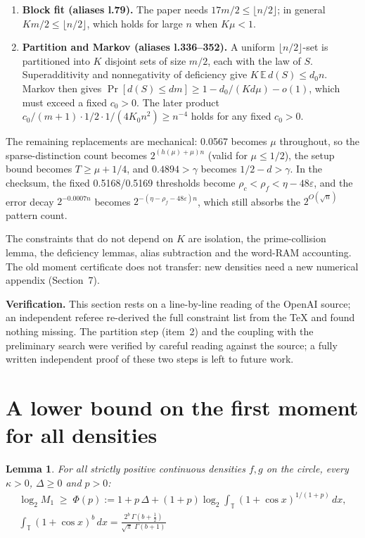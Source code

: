 \documentclass[11pt]{article}
\newcommand{\E}{\mathbb{E}}
\newcommand{\eps}{\varepsilon}
\theoremstyle{plain}
\newtheorem{lemma}{Lemma}
\begin{document}
\begin{enumerate}
\item \textbf{Block fit (aliases l.79).} The paper needs $17 m/2 \le \lfloor n/2 \rfloor$; in general $K m/2 \le \lfloor n/2 \rfloor$, which holds for large $n$ when $K\mu < 1$.
\item \textbf{Partition and Markov (aliases l.336--352).} A uniform $\lfloor n/2 \rfloor$-set is partitioned into $K$ disjoint sets of size $m/2$, each with the law of $S$. Superadditivity and nonnegativity of deficiency give $K\, \E\, d(S) \le d_0 n$. Markov then gives $\Pr[d(S) \le d m] \ge 1 - d_0/(K d \mu) - o(1)$, which must exceed a fixed $c_0 > 0$. The later product $c_0/(m+1) \cdot 1/2 \cdot 1/(4 K_0 n^2) \ge n^{-4}$ holds for any fixed $c_0 > 0$.
\end{enumerate}

The remaining replacements are mechanical: 0.0567 becomes $\mu$ throughout, so the sparse-distinction count becomes $2^{(h(\mu)+\mu)n}$ (valid for $\mu \le 1/2$), the setup bound becomes $T \ge \mu + 1/4$, and $0.4894 > \gamma$ becomes $1/2 - d > \gamma$. In the checksum, the fixed 0.5168/0.5169 thresholds become $\rho_c < \rho_f < \eta - 48\eps$, and the error decay $2^{-0.0007n}$ becomes $2^{-(\eta - \rho_f - 48\eps)n}$, which still absorbs the $2^{O(\sqrt{n})}$ pattern count.

The constraints that do not depend on $K$ are isolation, the prime-collision lemma, the deficiency lemmas, alias subtraction and the word-RAM accounting. The old moment certificate does not transfer: new densities need a new numerical appendix (Section~7).

\textbf{Verification.} This section rests on a line-by-line reading of the OpenAI source; an independent referee re-derived the full constraint list from the \TeX{} and found nothing missing. The partition step (item~2) and the coupling with the preliminary search were verified by careful reading against the source; a fully written independent proof of these two steps is left to future work.

\section{A lower bound on the first moment for all densities}

\begin{lemma}
For all strictly positive continuous densities $f, g$ on the circle, every $\kappa > 0$, $\Delta \ge 0$ and $p > 0$:
\begin{gather*}
\log_2 M_1 \;\ge\; \Phi(p) := 1 + p\,\Delta + (1+p)\log_2 \int_{\mathbb T} (1+\cos x)^{1/(1+p)}\,dx, \\ \int_{\mathbb T} (1+\cos x)^b\,dx = \frac{2^b\,\Gamma(b+\tfrac12)}{\sqrt{\pi}\;\Gamma(b+1)}
\end{gather*}
\end{lemma}
\end{document}
